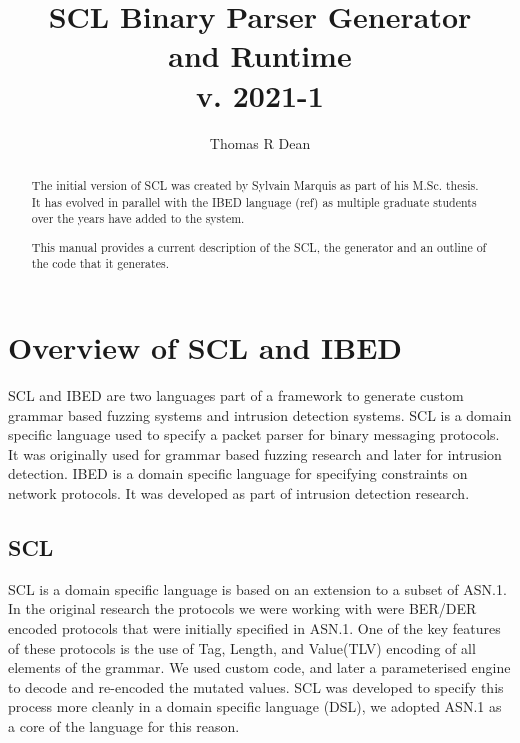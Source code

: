 \documentclass[12pt,oneside,letterpaper]{article}
\title{SCL Binary Parser Generator\\ and Runtime\\ \small{v. 2021-1}}
\author{Thomas R Dean}
\begin{document}
\maketitle


\begin{abstract}
The initial version of SCL was created by Sylvain Marquis as part of his M.Sc. thesis.
It has evolved in parallel with the IBED language (ref) as multiple graduate students over the years have added to the system.

This manual provides a current description of the SCL, the generator and an outline of the code that it generates.
\end{abstract}

\clearpage
\tableofcontents

\clearpage

\section{Overview of SCL and IBED}
\label{sec:Overview}

SCL and IBED are two languages part of a framework to generate custom grammar based fuzzing systems and intrusion detection systems. SCL is a domain specific language used to specify a packet parser for binary messaging protocols. It was originally used for grammar based fuzzing research and later for intrusion detection. IBED \cite{RakhaWISTP19} is a domain specific language for specifying constraints on network protocols. It was developed as part of intrusion detection research.

\subsection{SCL}
\label{sec:SCL}

SCL is a domain specific language is based on an extension to a subset of ASN.1. In the original research\cite{MILCOM04} the protocols we were working with were BER/DER\cite{DER} encoded protocols that were initially specified in ASN.1. One of the key features of these protocols is the use of Tag, Length, and Value(TLV) encoding of all elements of the grammar. We used custom code, and later a parameterised engine\cite{PST04} to decode and re-encoded the mutated values. SCL was developed to specify this process more cleanly in a domain specific language (DSL), we adopted ASN.1 as a core of the language for this reason. 
\end{document}

